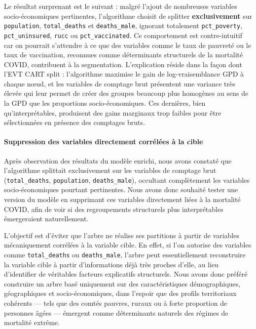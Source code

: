 \documentclass[11pt,a4paper]{article}
\begin{document}
Le résultat surprenant est le suivant : malgré l'ajout de nombreuses variables socio-économiques pertinentes, l'algorithme choisit de splitter \textbf{exclusivement} sur \texttt{population}, \texttt{total\_deaths} et \texttt{deaths\_male}, ignorant totalement \texttt{pct\_poverty}, \texttt{pct\_uninsured}, \texttt{rucc} ou \texttt{pct\_vaccinated}. Ce comportement est contre-intuitif car on pourrait s'attendre à ce que des variables comme le taux de pauvreté ou le taux de vaccination, reconnues comme déterminants structurels de la mortalité COVID, contribuent à la segmentation. L'explication réside dans la façon dont l'EVT CART split : l'algorithme maximise le gain de log-vraisemblance GPD à chaque n\oe{}ud, et les variables de comptage brut présentent une variance très élevée qui leur permet de créer des groupes beaucoup plus homogènes au sens de la GPD que les proportions socio-économiques. Ces dernières, bien qu'interprétables, produisent des gains marginaux trop faibles pour être sélectionnées en présence des comptages bruts.

\paragraph{Suppression des variables directement corrélées à la cible}

Après observation des résultats du modèle enrichi, nous avons constaté que l'algorithme splittait exclusivement sur les variables de comptage brut (\texttt{total\_deaths}, \texttt{population}, \texttt{deaths\_male}), occultant complètement les variables socio-économiques pourtant pertinentes. Nous avons donc souhaité tester une version du modèle en supprimant ces variables directement liées à la mortalité COVID, afin de voir si des regroupements structurels plus interprétables émergeraient naturellement.

L'objectif est d'éviter que l'arbre ne réalise ses partitions à partir de variables mécaniquement corrélées à la variable cible. En effet, si l'on autorise des variables comme \texttt{total\_deaths} ou \texttt{deaths\_male}, l'arbre peut essentiellement reconstruire la variable cible à partir d'informations déjà très proches d'elle, au lieu d'identifier de véritables facteurs explicatifs structurels. Nous avons donc préféré construire un arbre basé uniquement sur des caractéristiques démographiques, géographiques et socio-économiques, dans l'espoir que des profils territoriaux cohérents — tels que des comtés pauvres, ruraux ou à forte proportion de personnes âgées — émergent comme déterminants naturels des régimes de mortalité extrême.
\end{document}
